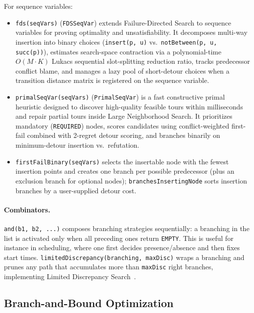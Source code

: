\documentclass[11pt, a4paper]{scrartcl}
\begin{document}
For sequence variables:
\begin{itemize}
    \item \texttt{fds(seqVars)} (\texttt{FDSSeqVar}) extends Failure-Directed Search to sequence variables for proving optimality and unsatisfiability. It decomposes multi-way insertion into binary choices (\texttt{insert(p, u)} vs.\ \texttt{notBetween(p, u, succ(p))}), estimates search-space contraction via a polynomial-time $O(M \cdot K)$ Lukacs sequential slot-splitting reduction ratio, tracks predecessor conflict blame, and manages a lazy pool of short-detour choices when a transition distance matrix is registered on the sequence variable.
    \item \texttt{primalSeqVar(seqVars)} (\texttt{PrimalSeqVar}) is a fast constructive primal heuristic designed to discover high-quality feasible tours within milliseconds and repair partial tours inside Large Neighborhood Search. It prioritizes mandatory (\texttt{REQUIRED}) nodes, scores candidates using conflict-weighted first-fail combined with 2-regret detour scoring, and branches binarily on minimum-detour insertion vs.\ refutation.
    \item \texttt{firstFailBinary(seqVars)} selects the insertable node with the fewest insertion points and creates one branch per possible predecessor (plus an exclusion branch for optional nodes); \texttt{branchesInsertingNode} sorts insertion branches by a user-supplied detour cost.
\end{itemize}

\paragraph{Combinators.}
\texttt{and(b1, b2, ...)} composes branching strategies sequentially: a branching in the list is activated only when all preceding ones return \texttt{EMPTY}.
This is useful for instance in scheduling, where one first decides presence/absence and then fixes start times.
\texttt{limitedDiscrepancy(branching, maxDisc)} wraps a branching and prunes any path that accumulates more than \texttt{maxDisc} right branches, implementing Limited Discrepancy Search~\cite{harvey1995limited}.

\subsection{Branch-and-Bound Optimization}
\end{document}
